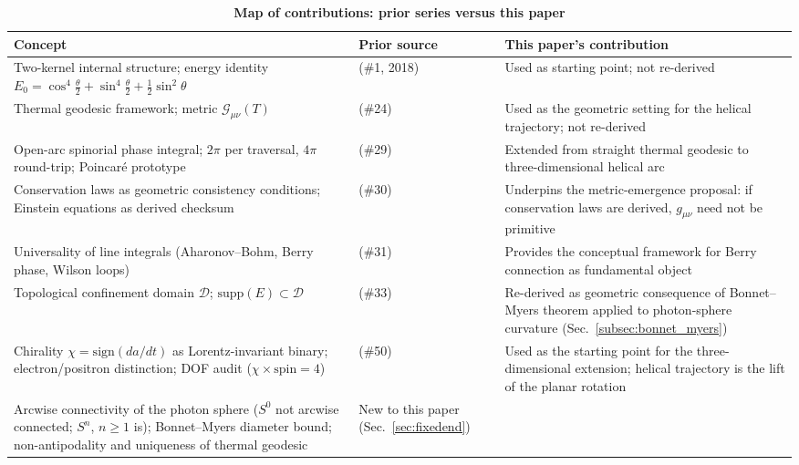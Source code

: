 \documentclass[%
 reprint, amsmath,amssymb, aps, prb, ]{revtex4-2}
\numberwithin{equation}{section}
\newcommand{\iphase}{\theta}  %
\begin{document}
\begin{table}[t!]
\centering
\caption{\textbf{Map of contributions: prior series versus this paper}}
\label{tab:contributions51}
\renewcommand{\arraystretch}{1.4}
\begin{tabular}{p{7.0cm}p{3.5cm}p{6.5cm}}
\toprule
\textbf{Concept} & \textbf{Prior source} & \textbf{This paper's contribution} \\
\midrule
Two-kernel internal structure; energy identity $E_0 = \cos^4\tfrac{\iphase}{2} + \sin^4\tfrac{\iphase}{2} + \tfrac{1}{2}\sin^2\iphase$
& \cite{hanamura01} (\#1, 2018)
& Used as starting point; not re-derived \\
\addlinespace[0.3cm]
Thermal geodesic framework; metric $\mathcal{G}_{\mu\nu}(T)$
& \cite{hanamura24} (\#24)
& Used as the geometric setting for the helical trajectory; not re-derived \\
\addlinespace[0.3cm]
Open-arc spinorial phase integral; $2\pi$ per traversal, $4\pi$ round-trip; Poincar\'{e} prototype
& \cite{hanamura29} (\#29)
& Extended from straight thermal geodesic to three-dimensional helical arc \\
\addlinespace[0.3cm]
Conservation laws as geometric consistency conditions; Einstein equations as derived checksum
& \cite{hanamura30} (\#30)
& Underpins the metric-emergence proposal: if conservation laws are derived, $g_{\mu\nu}$ need not be primitive \\
\addlinespace[0.3cm]
Universality of line integrals (Aharonov--Bohm, Berry phase, Wilson loops)
& \cite{hanamura31} (\#31)
& Provides the conceptual framework for Berry connection as fundamental object \\
\addlinespace[0.3cm]
Topological confinement domain $\mathcal{D}$; $\mathrm{supp}(E)\subset\mathcal{D}$
& \cite{hanamura33} (\#33)
& Re-derived as geometric consequence of Bonnet--Myers theorem applied to photon-sphere curvature (Sec.~\ref{subsec:bonnet_myers}) \\
\addlinespace[0.3cm]
Chirality $\chi = \mathrm{sign}(da/dt)$ as Lorentz-invariant binary; electron/positron distinction; DOF audit ($\chi\times\mathrm{spin}=4$)
& \cite{hanamura50} (\#50)
& Used as the starting point for the three-dimensional extension; helical trajectory is the lift of the planar rotation \\
\addlinespace[0.3cm]
Arcwise connectivity of the photon sphere ($S^0$ not arcwise connected; $S^n$, $n\geq 1$ is); Bonnet--Myers diameter bound; non-antipodality and uniqueness of thermal geodesic
& New to this paper (Sec.~\ref{sec:fixedend})

\end{tabular}
\end{table}
\end{document}
